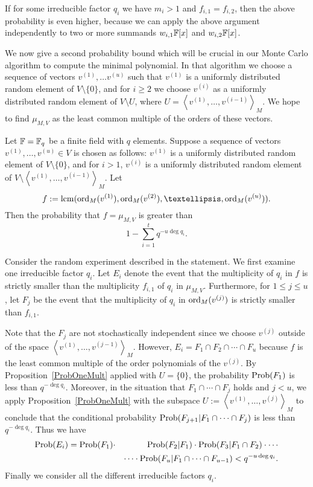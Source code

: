 \begin{Rem}
If for some irreducible factor $q_i$ we have $m_i > 1$
and $f_{i,1} = f_{i,2}$, then the above probability is even higher,
because we can apply the above argument independently to two or more summands
$w_{i,1}\mathbb{F}[x]$ and $w_{i,2}\mathbb{F}[x]$.
\end{Rem}


\smallskip
We now give a second probability bound which will be crucial in our
Monte Carlo algorithm to compute the minimal polynomial. In 
that algorithm we choose  a sequence of vectors 
$v^{(1)}, \dots v^{(u)}$ such that $v^{(1)}$ is a uniformly distributed
random element of $V\setminus\{0\}$, and for $i\geq2$ we choose
$v^{(i)}$ as a uniformly distributed random element of 
$V \setminus U$, where $U=\left< v^{(1)}, \ldots, v^{(i-1)} \right>_M$.
We hope to find $\mu_{M,V}$ as the least common multiple of the
orders of these vectors.


\begin{Prop}
\label{ProbAllMult}

\mbox{}\par
Let\/ $\mathbb{F} = \mathbb{F}_q$ be a finite field with $q$ elements.
Suppose a sequence of vectors $v^{(1)}, \ldots, v^{(u)} \in V$ is chosen
as follows: $v^{(1)}$ is a uniformly
distributed random element of $V\setminus\{0\}$, and for $i>1$,
$v^{(i)}$ is a  uniformly distributed random element of  
$V \setminus \left< v^{(1)}, \ldots, v^{(i-1)} \right>_M$. 
Let
\[ 
f := \lcm( \ord_M(v^{(1)}), \ord_M(v^{(2)}), \ldots, 
\ord_M(v^{(u)}) ). 
\]
Then the probability that  $f = \mu_{M,V}$  is greater than
\[ 1-\sum_{i=1}^t q^{-u\deg q_i}. \]
\end{Prop}
\proofbeg
Consider the random experiment described in the statement. We first
examine one irreducible factor $q_i$. Let $E_i$ denote the event
that the multiplicity of $q_i$ in $f$ is strictly smaller than 
the multiplicity $f_{i,1}$ of $q_i$ in $\mu_{M,V}$. Furthermore, for
$1 \le j \le u$, let $F_j$  be the event that the multiplicity of $q_i$ in
$\mathrm{ord}_M(v^{(j)})$ is strictly smaller than $f_{i,1}$. 

Note that
the $F_j$ are not stochastically independent since we choose
$v^{(j)}$ outside of the space $\left< v^{(1)}, \ldots, v^{(j-1)}\right>_M$.
However, $E_i = F_1 \cap F_2 \cap \cdots \cap F_u$ because $f$ is the
least common multiple of the order polynomials of the $v^{(j)}$.
By Proposition~\ref{ProbOneMult} applied with $U=\{0\}$, 
the probability $\mathrm{Prob}(F_1)$
is less than $q^{-\deg q_i}$. Moreover, in the situation that 
$F_1 \cap \cdots \cap F_j$ holds and $j<u$,
we apply Proposition~\ref{ProbOneMult} with the
subspace $U := \left< v^{(1)}, \ldots, v^{(j)} \right>_M$ to conclude
that the conditional probability $\mathrm{Prob}(F_{j+1} | F_1 \cap \cdots \cap F_j)$
is less than $q^{-\deg q_i}$.
Thus we have
\begin{eqnarray*}
\mathrm{Prob}(E_i) = \mathrm{Prob}(F_1)&\cdot& \mathrm{Prob}(F_2 | F_1) \cdot \mathrm{Prob}(F_3 | F_1 \cap F_2)
   \cdot \cdots \\
    && \cdots \cdot \mathrm{Prob}(F_u | F_1 \cap \cdots \cap F_{u-1}) 
   < q^{-u\deg q_i}.
\end{eqnarray*}
Finally we consider all the different irreducible factors $q_i$. 

